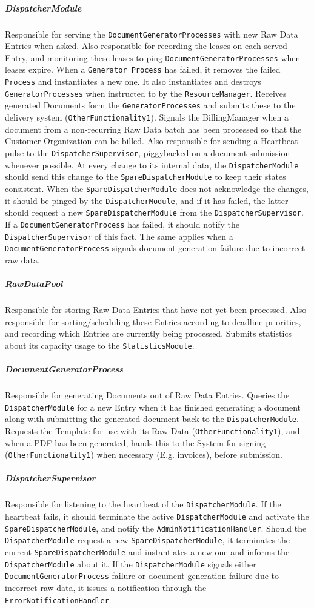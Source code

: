 \documentclass[a4paper,10pt]{article}
\begin{document}
\subparagraph{DispatcherModule}
Responsible for serving the \texttt{DocumentGeneratorProcesses} with new Raw Data Entries when asked. Also responsible for recording the leases on each served Entry, and monitoring these leases to ping \texttt{DocumentGeneratorProcesses} when leases expire. When a \texttt{Generator Process} has failed, it removes the failed \texttt{Process} and instantiates a new one. It also instantiates and destroys \texttt{GeneratorProcesses} when instructed to by the \texttt{ResourceManager}. Receives generated Documents form the \texttt{GeneratorProcesses} and submits these to the delivery system (\texttt{OtherFunctionality1}). Signals the BillingManager when a document from a non-recurring Raw Data batch has been processed so that the Customer Organization can be billed. Also responsible for sending a Heartbeat pulse to the \texttt{DispatcherSupervisor}, piggybacked on a document submission whenever possible. At every change to its internal data, the \texttt{DispatcherModule} should send this change to the \texttt{SpareDispatcherModule} to keep their states consistent. When the \texttt{SpareDispatcherModule} does not acknowledge the changes, it should be pinged by the \texttt{DispatcherModule}, and if it has failed, the latter should request a new \texttt{SpareDispatcherModule} from the \texttt{DispatcherSupervisor}. If a \texttt{Document\-Generator\-Process} has failed, it should notify the \texttt{DispatcherSupervisor} of this fact. The same applies when a \texttt{Document\-Generator\-Process} signals document generation failure due to incorrect raw data.

\subparagraph{RawDataPool}
Responsible for storing Raw Data Entries that have not yet been processed. Also responsible for sorting/scheduling these Entries according to deadline priorities, and recording which Entries are currently being processed. Submits statistics about its capacity usage to the \texttt{StatisticsModule}.

\subparagraph{DocumentGeneratorProcess}
Responsible for generating Documents out of Raw Data Entries. Queries the \texttt{DispatcherModule} for a new Entry when it has finished generating a document along with submitting the generated document back to the \texttt{DispatcherModule}. Requests the Template for use with its Raw Data (\texttt{OtherFunctionality1}), and when a PDF has been generated, hands this to the System for signing (\texttt{OtherFunctionality1}) when necessary (E.g. invoices), before submission.

\subparagraph{DispatcherSupervisor}
Responsible for listening to the heartbeat of the \texttt{DispatcherModule}. If the heartbeat fails, it should terminate the active \texttt{DispatcherModule} and activate the \texttt{SpareDispatcherModule}, and notify the \texttt{AdminNotificationHandler}. Should the \texttt{DispatcherModule} request a new \texttt{Spare\-Dispatcher\-Module}, it terminates the current \texttt{Spare\-Dispatcher\-Module} and instantiates a new one and informs the \texttt{Dispatcher\-Module} about it. If the \texttt{Dispatcher\-Module} signals either \texttt{DocumentGeneratorProcess} failure or document generation failure due to incorrect raw data, it issues a notification through the \texttt{Error\-Notification\-Handler}.
\end{document}
